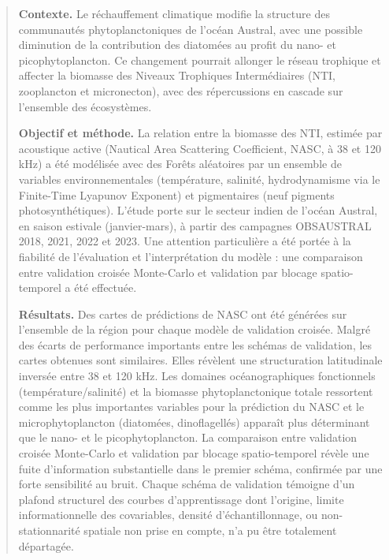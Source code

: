 \begin{abstract}
	
	\textbf{Contexte.} Le réchauffement climatique modifie la structure des communautés phytoplanctoniques de l'océan Austral, avec une possible diminution de la contribution des diatomées au profit du nano- et picophytoplancton. Ce changement pourrait allonger le réseau trophique et affecter la biomasse des Niveaux Trophiques Intermédiaires (NTI, zooplancton et micronecton), avec des répercussions en cascade sur l'ensemble des écosystèmes.
	
	\vspace{0.3cm}
	
	\textbf{Objectif et méthode.} La relation entre la biomasse des NTI, estimée par acoustique active (Nautical Area Scattering Coefficient, NASC, à 38 et 120 kHz) a été modélisée avec des Forêts aléatoires par un ensemble de variables environnementales (température, salinité, hydrodynamisme via le Finite-Time Lyapunov Exponent) et pigmentaires (neuf pigments photosynthétiques). L'étude porte sur le secteur indien de l'océan Austral, en saison estivale (janvier-mars), à partir des campagnes OBSAUSTRAL 2018, 2021, 2022 et 2023. Une attention particulière a été portée à la fiabilité de l'évaluation et l'interprétation du modèle : une comparaison entre validation croisée Monte-Carlo et validation par blocage spatio-temporel a été effectuée. 
	
	\vspace{0.3cm}
	
	\textbf{Résultats.} Des cartes de prédictions de NASC ont été générées sur l'ensemble de la région pour chaque modèle de validation croisée. Malgré des écarts de performance importants entre les schémas de validation, les cartes obtenues sont similaires. Elles révèlent une structuration latitudinale inversée entre 38 et 120 kHz. Les domaines océanographiques fonctionnels (température/salinité) et la biomasse phytoplanctonique totale ressortent comme les plus importantes variables pour la prédiction du NASC et le microphytoplancton (diatomées, dinoflagellés) apparaît plus déterminant que le nano- et le picophytoplancton. La comparaison entre validation croisée Monte-Carlo et validation par blocage spatio-temporel révèle une fuite d'information substantielle dans le premier schéma, confirmée par une forte sensibilité au bruit.  Chaque schéma de validation témoigne d'un plafond structurel des courbes d'apprentissage dont l'origine, limite informationnelle des covariables, densité d'échantillonnage, ou non-stationnarité spatiale non prise en compte, n'a pu être totalement départagée. 
	

\end{abstract}
